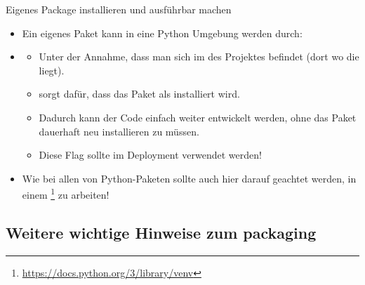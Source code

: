 \documentclass[12pt, aspectratio=169, usepdftitle=false]{beamer}
\newcommand{\furl}[1]{\footnote{\url{#1}}}
\begin{document}
\begin{frame}{Eigenes Package installieren und ausführbar machen}
	\begin{itemize}
		\item Ein eigenes Paket kann in eine Python Umgebung  werden durch:
		\item[] 
		\begin{itemize}
			\pause
			\item Unter der Annahme, dass man sich im  des Projektes befindet (dort wo die  liegt).
			\pause
			\item {} sorgt dafür, dass das Paket als  installiert wird.
			\item[] Dadurch kann der Code einfach weiter entwickelt werden, ohne das Paket dauerhaft neu installieren zu müssen.
			\pause
			\item[] Diese Flag sollte  im Deployment verwendet werden!
			
		\end{itemize}
		\pause
		\item Wie bei allen  von Python-Paketen sollte auch hier darauf geachtet werden, in einem \furl{https://docs.python.org/3/library/venv} zu arbeiten!
	\end{itemize}
	
\end{frame}

\subsection{Weitere wichtige Hinweise zum packaging}
\end{document}
